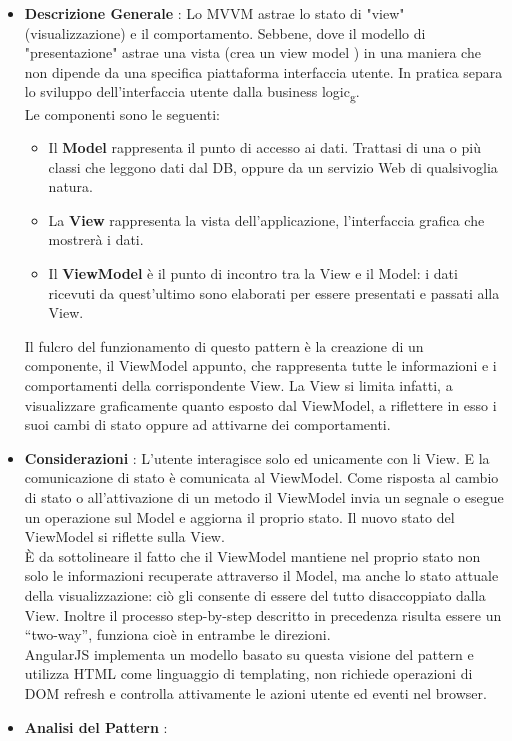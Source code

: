 {{{			\begin{itemize}\itemsep1pt
				\item \textbf{Descrizione Generale} : Lo MVVM astrae lo stato di "view" (visualizzazione) e il comportamento. Sebbene, dove il modello di "presentazione" astrae una vista (crea un view model ) in una maniera che non dipende da una specifica piattaforma interfaccia utente. In pratica separa lo sviluppo dell'interfaccia utente dalla business logic\textsubscript{g}.\\
				Le componenti sono le seguenti:
				\begin{itemize}
					\item Il \textbf{Model} rappresenta il punto di accesso ai dati. Trattasi di una o più classi che leggono dati dal DB, oppure da un servizio Web di qualsivoglia natura.
					\item La \textbf{View} rappresenta la vista dell'applicazione, l'interfaccia grafica che mostrerà i dati.
					\item Il \textbf{ViewModel} è il punto di incontro tra la View e il Model: i dati ricevuti da quest’ultimo sono elaborati per essere presentati e passati alla View.
				\end{itemize}
				Il fulcro del funzionamento di questo pattern è la creazione di un componente, il ViewModel appunto, che rappresenta tutte le informazioni e i comportamenti della corrispondente View. La View si limita infatti, a visualizzare graficamente quanto esposto dal ViewModel, a riflettere in esso i suoi cambi di stato oppure ad attivarne dei comportamenti.
				\item \textbf{Considerazioni} : L'utente interagisce solo ed unicamente con li View. E la comunicazione di stato è comunicata al ViewModel. Come risposta al cambio di stato o all'attivazione di un metodo il ViewModel invia un segnale o esegue un operazione sul Model e aggiorna il proprio stato. Il nuovo stato del ViewModel si riflette sulla View.\\
				È da sottolineare il fatto che il ViewModel mantiene nel proprio stato non solo le informazioni recuperate attraverso il Model, ma anche lo stato attuale della visualizzazione: ciò gli consente di essere del tutto disaccoppiato dalla View. Inoltre il processo step-by-step descritto in precedenza risulta essere un “two-way”, funziona cioè in entrambe le direzioni.\\
				AngularJS implementa un modello basato su questa visione del pattern e utilizza HTML come linguaggio di templating, non richiede operazioni di DOM refresh e controlla attivamente le azioni utente ed eventi nel browser. 
				\item \textbf{Analisi del Pattern} : \hfill
				

\end{itemize}}}}
